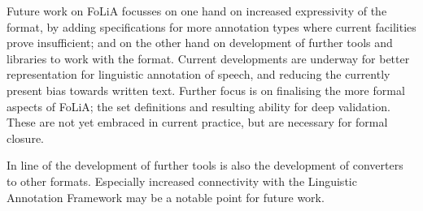 \documentclass[a4paper,10pt,twoside]{article}
\begin{document}
Future work on FoLiA focusses on one hand on increased expressivity of the
format, by adding specifications for more annotation types where current
facilities prove insufficient; and on the other hand on development of further
tools and libraries to work with the format. Current developments are
underway for better representation for linguistic annotation of speech, and
reducing the currently present bias towards written text. Further focus is on
finalising the more formal aspects of FoLiA; the set definitions and resulting
ability for deep validation. These are not yet embraced in current practice,
but are necessary for formal closure.

In line of the development of further tools is also the development of
converters to other formats. Especially increased connectivity with the
Linguistic Annotation Framework may be a notable point for future work.

 
  
\end{document}
